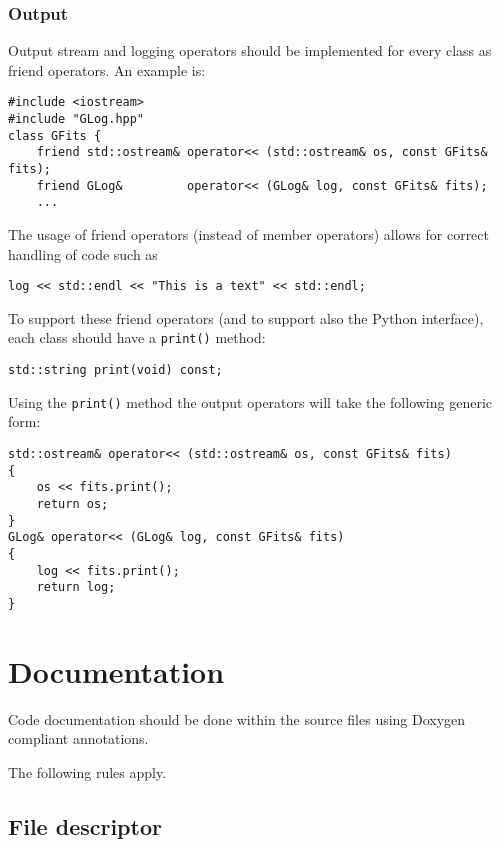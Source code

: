 \documentclass{article}[12pt,a4]
\begin{document}
\subsubsection{Output}
\label{sec:output}

Output stream and logging operators should be implemented for every class as friend
operators.
An example is:
\begin{verbatim}
#include <iostream>
#include "GLog.hpp"
class GFits {
    friend std::ostream& operator<< (std::ostream& os, const GFits& fits);
    friend GLog&         operator<< (GLog& log, const GFits& fits);
    ...
\end{verbatim}
The usage of friend operators (instead of member operators) allows for correct handling
of code such as
\begin{verbatim}
log << std::endl << "This is a text" << std::endl;
\end{verbatim}
To support these friend operators (and to support also the Python interface), each class
should have a {\tt print()} method:
\begin{verbatim}
std::string print(void) const;
\end{verbatim}
Using the {\tt print()} method the output operators will take the following generic form:
\begin{verbatim}
std::ostream& operator<< (std::ostream& os, const GFits& fits)
{
    os << fits.print();
    return os;
}
GLog& operator<< (GLog& log, const GFits& fits)
{
    log << fits.print();
    return log;
}
\end{verbatim}


\section{Documentation}

Code documentation should be done within the source files using Doxygen
compliant annotations.

The following rules apply.


\subsection{File descriptor}
\end{document}
